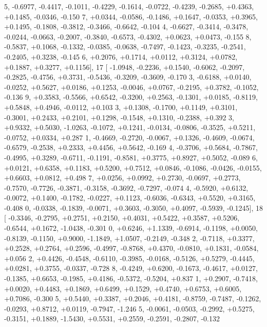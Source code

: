 \begin{DoxyCode}
      5, -0.6977, -0.4417, -0.1011, -0.4229, -0.1614, -0.0722, -0.4239, -0.2685, +0.4363, +0.1485, -0.0346, -0.150
      7, +0.0344, -0.0586, -0.1486, +0.1647, -0.0353, +0.3965, +0.1495, -0.1808, -0.3812, -0.3466, -0.6642, -0.104
      4, -0.6627, -0.3414, -0.3478, -0.0244, -0.0663, -0.2007, -0.3840, -0.6573, -0.4302, +0.0623, +0.0473, -0.155
      8, -0.5837, +0.1068, -0.1332, -0.0385, -0.0638, -0.7497, -0.1423, -0.3235, -0.2541, -0.2405, +0.3238, -0.145
      6, +0.2076, +0.1714, +0.0112, +0.3124, +0.0782, +0.1887, +0.3277, +0.1156],
17 [ -1.0948, -0.2236, +0.1540, -0.6062, -0.2097, -0.2825, -0.4756, +0.3731, -0.5436, -0.3209, -0.3609, -0.170
      3, -0.6188, +0.0140, -0.0252, +0.5627, +0.0186, +0.1253, -0.0046, +0.0767, -0.2195, +0.3782, -0.1052, -0.136
      9, +0.3583, -0.5566, +0.6542, -0.3200, +0.2563, -0.1301, +0.0185, -0.8119, +0.5848, +0.4946, -0.0112, +0.103
      3, +0.1308, -0.1700, +0.1149, +0.3101, -0.3001, +0.2433, +0.2101, +0.1298, -0.1548, +0.1310, -0.2388, +0.392
      3, +0.9332, +0.5030, -1.0263, -0.1072, +0.1241, -0.0134, -0.0806, -0.3525, +0.5211, -0.0752, +0.0334, +0.287
      1, -0.4669, -0.2720, -0.0067, +0.1326, -0.4609, -0.0674, -0.6579, -0.2538, +0.2333, +0.4456, +0.5642, -0.169
      4, -0.3706, +0.5684, -0.7867, -0.4995, +0.3289, -0.6711, -0.1191, -0.8581, +0.3775, +0.8927, +0.5052, -0.089
      6, +0.0121, +0.6358, +0.1183, +0.5200, +0.7512, +0.0846, -0.1086, -0.0426, -0.0155, +0.6603, +0.0812, +0.498
      7, +0.0256, +0.0992, +0.2730, -0.0697, +0.2773, -0.7570, -0.7726, -0.3871, -0.3158, -0.3692, -0.7297, -0.074
      4, -0.5920, +0.6132, -0.0072, +0.1400, -0.1782, -0.0227, +0.1123, -0.6036, -0.6343, +0.5520, +0.3165, -0.408
      0, -0.0338, -0.1839, -0.0071, +0.3603, -0.3050, +0.4097, -0.5939, -0.1245],
18 [ -0.3346, -0.2795, +0.2751, +0.2150, +0.4031, +0.5422, +0.3587, +0.5206, -0.6544, +0.1672, -1.0438, -0.301
      0, +0.6246, +1.1339, -0.6914, -0.1198, +0.0050, -0.8139, -0.1150, +0.9000, -1.1849, +1.0507, -0.2149, -0.348
      2, -0.7118, +0.3377, +0.2528, +0.2764, +0.2596, -0.4997, -0.8768, +0.4370, -0.0810, +0.1831, -0.0584, +0.056
      2, +0.4426, -0.4548, -0.6110, -0.3985, -0.0168, -0.5126, +0.5279, -0.4445, +0.0281, +0.3755, -0.0337, -0.728
      8, -0.4249, +0.6200, -0.1673, -0.4617, +0.0127, -0.1385, +0.6653, -0.1985, +0.4186, -0.5372, -0.5204, +0.837
      1, +0.2907, -0.7418, +0.0020, +0.4483, +0.1869, +0.6499, +0.1529, +0.4740, +0.6753, +0.6005, +0.7086, -0.300
      5, +0.5440, +0.3387, +0.2046, +0.4181, -0.8759, -0.7487, -0.1262, -0.0293, +0.8712, +0.0119, -0.7947, -1.246
      5, -0.0061, -0.0503, -0.2992, +0.5275, -0.3151, +0.1889, -1.5430, +0.5531, +0.2559, -0.2591, -0.2807, -0.132

\end{DoxyCode}
